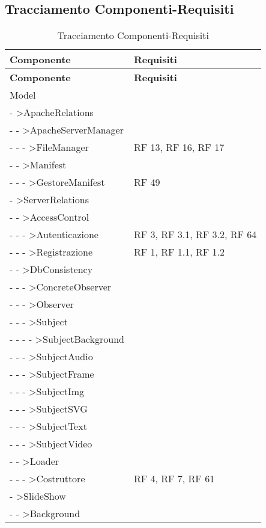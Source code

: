 \subsection{Tracciamento Componenti-Requisiti}{ 
\renewcommand*{\arraystretch}{1.4} 
\begin{longtable} [c]{| p{8cm} | p{6cm} |} 
\caption{Tracciamento Componenti-Requisiti \label{tab:traccCompReq}}\\ \hline\textbf{Componente} & \textbf{Requisiti} \\ 
\hline \endfirsthead \hline 
\textbf{Componente} & \textbf{Requisiti} \\ 
\hline \endhead \hline \endfoot \hline \endlastfoot 
Model & \\ 
 \hline 
- >ApacheRelations & \\ 
 \hline 
- - >ApacheServerManager & \\ 
 \hline 
- - - >FileManager & RF 13, RF 16, RF 17\\ 
 \hline 
- - >Manifest & \\ 
 \hline 
- - - >GestoreManifest & RF 49\\ 
 \hline 
- >ServerRelations & \\ 
 \hline 
- - >AccessControl & \\ 
 \hline 
- - - >Autenticazione & RF 3, RF 3.1, RF 3.2, RF 64\\ 
 \hline 
- - - >Registrazione & RF 1, RF 1.1, RF 1.2\\ 
 \hline 
- - >DbConsistency & \\ 
 \hline 
- - - >ConcreteObserver & \\ 
 \hline 
- - - >Observer & \\ 
 \hline 
- - - >Subject & \\ 
 \hline 
- - - - >SubjectBackground & \\ 
 \hline 
- - - >SubjectAudio & \\ 
 \hline 
- - - >SubjectFrame & \\ 
 \hline 
- - - >SubjectImg & \\ 
 \hline 
- - - >SubjectSVG & \\ 
 \hline 
- - - >SubjectText & \\ 
 \hline 
- - - >SubjectVideo & \\ 
 \hline 
- - >Loader & \\ 
 \hline 
- - - >Costruttore & RF 4, RF 7, RF 61\\ 
 \hline 
- >SlideShow & \\ 
 \hline 
- - >Background & \\ 

\end{longtable}}
